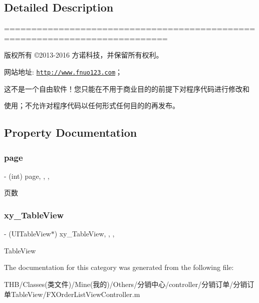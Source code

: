 \subsection{Detailed Description}
============================================================================

版权所有 ©2013-\/2016 方诺科技，并保留所有权利。

网站地址\+: \href{http://www.fnuo123.com}{\tt http\+://www.\+fnuo123.\+com}； 



这不是一个自由软件！您只能在不用于商业目的的前提下对程序代码进行修改和

使用；不允许对程序代码以任何形式任何目的的再发布。 

 

\subsection{Property Documentation}
\mbox{\label{category_f_x_order_list_view_controller_07_08_a9f289de2e1ba94a5b76c56506ef3a7f7}} 
\subsubsection{\texorpdfstring{page}{page}}
{\footnotesize\ttfamily -\/ (int) page\hspace{0.3cm}{\ttfamily [read]}, {\ttfamily [write]}, {\ttfamily [nonatomic]}, {\ttfamily [assign]}}

页数 \mbox{\label{category_f_x_order_list_view_controller_07_08_ae26b29ab674223b4d2b3358532456cae}} 
\subsubsection{\texorpdfstring{xy\+\_\+\+Table\+View}{xy\_TableView}}
{\footnotesize\ttfamily -\/ (U\+I\+Table\+View$\ast$) xy\+\_\+\+Table\+View\hspace{0.3cm}{\ttfamily [read]}, {\ttfamily [write]}, {\ttfamily [nonatomic]}, {\ttfamily [strong]}}

Table\+View 

The documentation for this category was generated from the following file\+:\begin{DoxyCompactItemize}
\item 
T\+H\+B/\+Classes(类文件)/\+Mine(我的)/\+Others/分销中心/controller/分销订单/分销订单\+Table\+View/F\+X\+Order\+List\+View\+Controller.\+m\end{DoxyCompactItemize}
